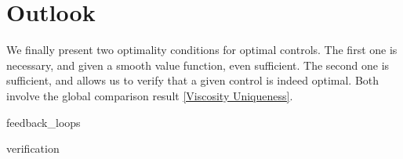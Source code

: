 \chapter{Outlook}

We finally present two optimality conditions for optimal controls. The first one is necessary, and given a smooth value function, even sufficient. The second one is sufficient, and allows us to verify that a given control is indeed optimal. Both involve the global comparison result \ref{Viscosity Uniqueness}.

{feedback_loops}

{verification}